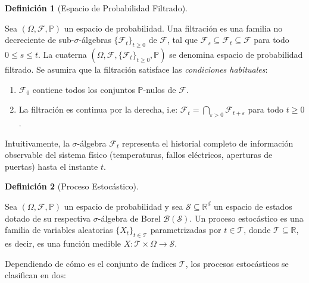 \documentclass[
  spanish,
  us-letterpaper,
]{scrreprt}
\providecommand{\tightlist}{%
  \setlength{\itemsep}{0pt}\setlength{\parskip}{0pt}}
\numberwithin{equation}{section}
\theoremstyle{plain}
\theoremstyle{plain}
\theoremstyle{definition}
\newtheorem{definition}{Definición}[chapter]
\theoremstyle{plain}
\theoremstyle{remark}
\begin{document}
\begin{definition}[Espacio de Probabilidad
Filtrado]\protect\hypertarget{def-espacio-filtrado}{}\label{def-espacio-filtrado}

Sea \((\Omega, \mathcal{F}, \mathbb{P})\) un espacio de probabilidad.
Una filtración es una familia no decreciente de sub-\(\sigma\)-álgebras
\(\{\mathcal{F}_t\}_{t \ge 0}\) de \(\mathcal{F}\), tal que
\(\mathcal{F}_s \subseteq \mathcal{F}_t \subseteq \mathcal{F}\) para
todo \(0 \le s \le t\). La cuaterna
\((\Omega, \mathcal{F}, \{\mathcal{F}_t\}_{t \ge 0}, \mathbb{P})\) se
denomina espacio de probabilidad filtrado. Se asumira que la filtración
satisface las \emph{condiciones habituales}:

\begin{enumerate}
\def\labelenumi{\arabic{enumi}.}
\tightlist
\item
  \(\mathcal{F}_0\) contiene todos los conjuntos \(\mathbb{P}\)-nulos de
  \(\mathcal{F}\).
\item
  La filtración es continua por la derecha, i.e:
  \(\displaystyle \mathcal{F}_t = \bigcap_{\varepsilon > 0} \mathcal{F}_{t+\varepsilon}\)
  para todo \(t \ge 0\).
\end{enumerate}

\end{definition}

Intuitivamente, la \(\sigma\)-álgebra \(\mathcal{F}_t\) representa el
historial completo de información observable del sistema físico
(temperaturas, fallos eléctricos, aperturas de puertas) hasta el
instante \(t\).

\begin{definition}[Proceso
Estocástico]\protect\hypertarget{def-proceso-estocastico}{}\label{def-proceso-estocastico}

Sea \((\Omega, \mathcal{F}, \mathbb{P})\) un espacio de probabilidad y
sea \(\mathcal{S} \subseteq \mathbb{R}^d\) un espacio de estados dotado
de su respectiva \(\sigma\)-álgebra de Borel
\(\mathcal{B}(\mathcal{S})\). Un proceso estocástico es una familia de
variables aleatorias \(\{X_t\}_{t \in \mathcal{T}}\) parametrizadas por
\(t \in \mathcal{T}\), donde \(\mathcal{T} \subseteq \mathbb{R}\), es
decir, es una función medible
\(X: \mathcal{T} \times \Omega \to \mathcal{S}\).

\end{definition}

Dependiendo de cómo es el conjunto de índices \(\mathcal{T}\), los
procesos estocásticos se clasifican en dos:
\end{document}
